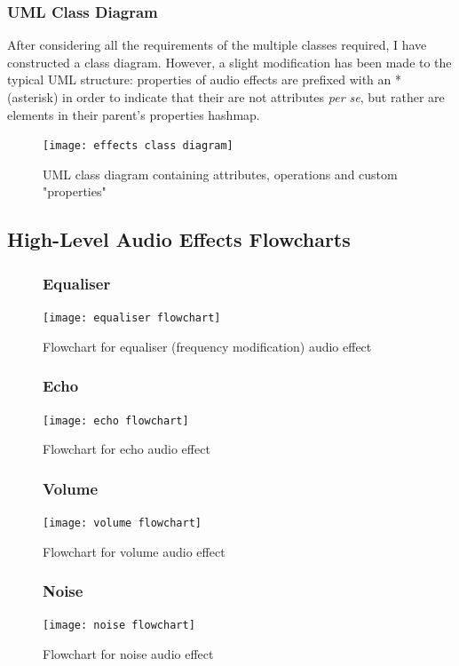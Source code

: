 \subsubsection{UML Class Diagram}
After considering all the requirements of the multiple classes required, I have constructed a class diagram. However, a slight modification has been made to the typical UML structure: properties of audio effects are prefixed with an * (asterisk) in order to indicate that their are not attributes {\it per se}, but rather are elements in their parent's properties hashmap.

\begin{figure}[h]
	\texttt{[image: effects class diagram]}
	\caption{UML class diagram containing attributes, operations and custom "properties"}
\end{figure}

\pagebreak

\subsection{High-Level Audio Effects Flowcharts}
\begin{figure}[H]
	\subsubsection{Equaliser}
	\texttt{[image: equaliser flowchart]}
	\caption{Flowchart for equaliser (frequency modification) audio effect}
\end{figure}

\begin{figure}[H]
	\subsubsection{Echo}
	\texttt{[image: echo flowchart]}
	\caption{Flowchart for echo audio effect}
\end{figure}

\begin{figure}[H]
	\subsubsection{Volume}
	\texttt{[image: volume flowchart]}
	\caption{Flowchart for volume audio effect}
\end{figure}

\begin{figure}[H]
	\subsubsection{Noise}
	\texttt{[image: noise flowchart]}
	\caption{Flowchart for noise audio effect}
\end{figure}

